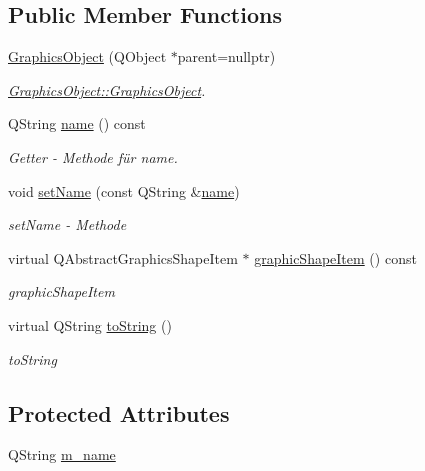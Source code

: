 \subsection*{Public Member Functions}
\begin{DoxyCompactItemize}
\item 
\hyperlink{class_graphics_object_a82fb630ff536190739e347b68716f603}{Graphics\+Object} (Q\+Object $\ast$parent=nullptr)
\begin{DoxyCompactList}\small\item\em \hyperlink{class_graphics_object_a82fb630ff536190739e347b68716f603}{Graphics\+Object\+::\+Graphics\+Object}. \end{DoxyCompactList}\item 
Q\+String \hyperlink{class_graphics_object_ac5591ff2b8009451c593d1197ce7a162}{name} () const
\begin{DoxyCompactList}\small\item\em Getter -\/ Methode für name. \end{DoxyCompactList}\item 
void \hyperlink{class_graphics_object_a1b0c7c7f87e86833a9a23ab1a2b6f685}{set\+Name} (const Q\+String \&\hyperlink{class_graphics_object_ac5591ff2b8009451c593d1197ce7a162}{name})
\begin{DoxyCompactList}\small\item\em set\+Name -\/ Methode \end{DoxyCompactList}\item 
virtual Q\+Abstract\+Graphics\+Shape\+Item $\ast$ \hyperlink{class_graphics_object_ad898be2fdbcc4c57f908cdd6a3feaa44}{graphic\+Shape\+Item} () const
\begin{DoxyCompactList}\small\item\em graphic\+Shape\+Item \end{DoxyCompactList}\item 
virtual Q\+String \hyperlink{class_graphics_object_ad985316df1516a5a7311161250b5e233}{to\+String} ()
\begin{DoxyCompactList}\small\item\em to\+String \end{DoxyCompactList}\end{DoxyCompactItemize}
\subsection*{Protected Attributes}
\begin{DoxyCompactItemize}
\item 
Q\+String \hyperlink{class_graphics_object_aaa6fae9a6fac8fd912b3bf5b3c98fc26}{m\+\_\+name}
\end{DoxyCompactItemize}
